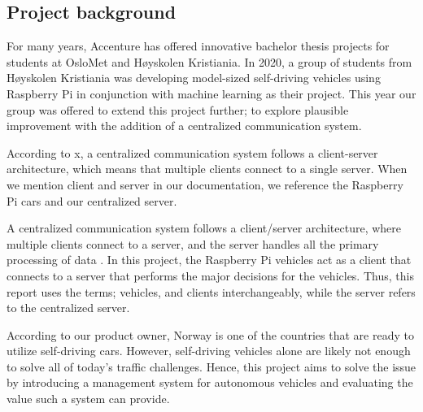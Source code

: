 \subsection{Project background}
For many years, Accenture has offered innovative bachelor thesis projects for students at OsloMet and Høyskolen Kristiania. In 2020, a group of students from Høyskolen Kristiania was developing model-sized self-driving vehicles using Raspberry Pi in conjunction with machine learning as their project. This year our group was offered to extend this project further; to explore plausible improvement with the addition of a centralized communication system.

According to x, a centralized communication system follows a client-server architecture, which means that multiple clients connect to a single server. When we mention client and server in our documentation, we reference the Raspberry Pi cars and our centralized server.

A centralized communication system follows a client/server architecture, where multiple clients connect to a server, and the server handles all the primary processing of data \parencite{centralized}. In this project, the Raspberry Pi vehicles act as a client that connects to a server that performs the major decisions for the vehicles. Thus, this report uses the terms; vehicles, and clients interchangeably, while the server refers to the centralized server.

According to our product owner, Norway is one of the countries that are ready to utilize self-driving cars. However, self-driving vehicles alone are likely not enough to solve all of today's traffic challenges. Hence, this project aims to solve the issue by introducing a management system for autonomous vehicles and evaluating the value such a system can provide.